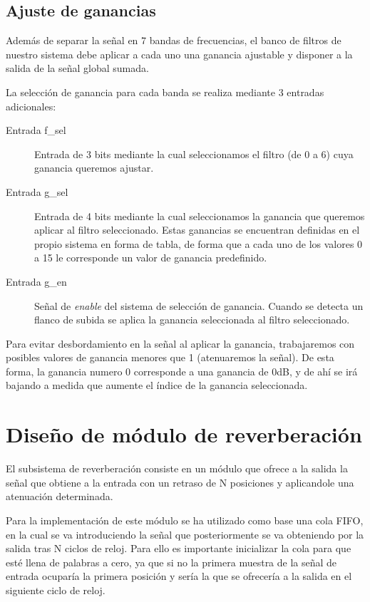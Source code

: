 \documentclass[a4paper,12pt]{article}
\begin{document}
\subsection{Ajuste de ganancias}
Además de separar la señal en 7 bandas de frecuencias, el banco de filtros de nuestro sistema debe aplicar a cada uno una ganancia ajustable y disponer a la salida de la señal global sumada.

La selección de ganancia para cada banda se realiza mediante 3 entradas adicionales:
\begin{description}
\item[Entrada f\_sel] Entrada de 3 bits mediante la cual seleccionamos el filtro (de 0 a 6) cuya ganancia queremos ajustar.
\item[Entrada g\_sel] Entrada de 4 bits mediante la cual seleccionamos la ganancia que queremos aplicar al filtro seleccionado. Estas ganancias se encuentran definidas en el propio sistema en forma de tabla, de forma que a cada uno de los valores 0 a 15 le corresponde un valor de ganancia predefinido.
\item[Entrada g\_en] Señal de \emph{enable} del sistema de selección de ganancia. Cuando se detecta un flanco de subida se aplica la ganancia seleccionada al filtro seleccionado.
\end{description}

Para evitar desbordamiento en la señal al aplicar la ganancia, trabajaremos con posibles valores de ganancia menores que 1 (atenuaremos la señal). De esta forma, la ganancia numero 0 corresponde a una ganancia de 0dB, y de ahí se irá bajando a medida que aumente el índice de la ganancia seleccionada.

\clearpage
\section{Diseño de módulo de reverberación}
El subsistema de reverberación consiste en un módulo que ofrece a la salida la señal que obtiene a la entrada con un retraso de N posiciones y aplicandole una atenuación determinada.

Para la implementación de este módulo se ha utilizado como base una cola FIFO, en la cual se va introduciendo la señal que posteriormente se va obteniendo por la salida tras N ciclos de reloj. Para ello es importante inicializar la cola para que esté llena de palabras a cero, ya que si no la primera muestra de la señal de entrada ocuparía la primera posición y sería la que se ofrecería a la salida en el siguiente ciclo de reloj.
\end{document}
